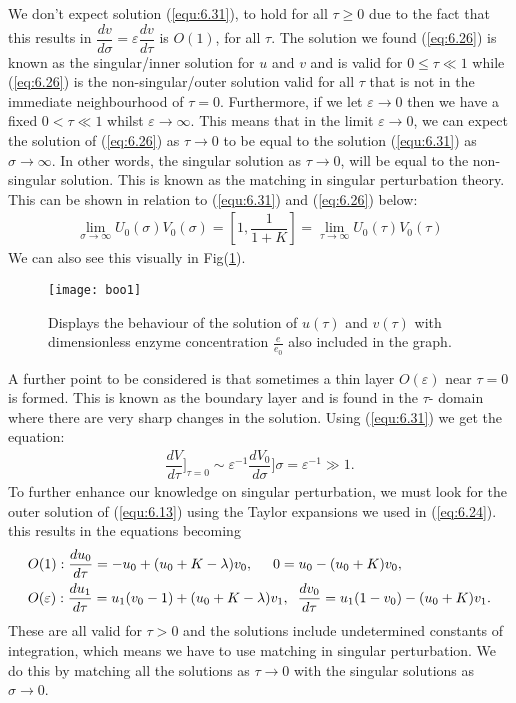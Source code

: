 \documentclass[a4paper]{report}
\theoremstyle{definition}
\begin{document}
We don't expect solution (\ref{equ:6.31}), to hold for all $\tau\geq0$ due to the fact that this results in $\dfrac{dv}{d\sigma}=\varepsilon\dfrac{dv}{d\tau}$ is $O(1)$, for all $\tau$. The solution we found (\ref{eq:6.26}) is known as the singular/inner solution for $u$ and $v$ and is valid for $0\leq\tau\ll1$ while (\ref{eq:6.26}) is the non-singular/outer solution valid for all $\tau$ that is not in the immediate neighbourhood of $\tau=0$. Furthermore, if we let $\varepsilon\rightarrow0$ then we have a fixed $0<\tau\ll1$ whilst $\varepsilon\rightarrow\infty$. This means that in the limit $\varepsilon\rightarrow0$, we can expect the solution of (\ref{eq:6.26}) as $\tau\rightarrow0$ to be equal to the solution (\ref{equ:6.31}) as $\sigma\rightarrow\infty$. In other words, the singular solution as $\tau\rightarrow0$, will be equal to the non-singular solution. This is known as the matching in singular perturbation theory. This can be shown in relation to (\ref{equ:6.31}) and (\ref{eq:6.26}) below:
\begin{align}
\lim_{\sigma \to \infty}U_0(\sigma)V_0(\sigma)=\left[1,\dfrac{1}{1+K}\right]=\lim_{\tau \to \infty}U_0(\tau)V_0(\tau)
\end{align}
We can also see this visually in Fig(\ref{figure1a}).
\begin{figure}
 \texttt{[image: boo1]}
   \caption{Displays the behaviour of the solution of $u(\tau)$ and $v(\tau)$ with dimensionless enzyme concentration $\frac{e}{e_0}$ also included in the graph. }
  \label{figure1a}
\end{figure}
A further point to be considered is that sometimes a thin layer $O(\varepsilon)$ near $\tau=0$ is formed. This is known as the boundary layer and is found in the $\tau$- domain where there are very sharp changes in the solution. Using (\ref{equ:6.31}) we get the equation:
\begin{align}
\dfrac{dV}{d\tau}]_{\tau=0}\sim\varepsilon^{-1}\dfrac{dV_0}{d\sigma}]\sigma=\varepsilon^{-1}\gg1.
\end{align}
To further enhance our knowledge on singular perturbation, we must look for the outer solution of (\ref{equ:6.13}) using the Taylor expansions we used in (\ref{eq:6.24}). this results in the equations becoming
\begin{align}\label{equ:6.32}
&O(1): \dfrac{du_0}{d\tau}=-u_0+(u_0+K-\lambda)v_0,\hspace{5mm} 0=u_0-(u_0+K)v_0,\\
&O(\varepsilon): \dfrac{du_1}{d\tau}=u_1(v_0-1)+(u_0+K-\lambda)v_1,\hspace{2mm}\dfrac{dv_0}{d\tau}=u_1(1-v_0)-(u_0+K)v_1.
\end{align}
These are all valid for $\tau>0$ and the solutions include undetermined constants of integration, which means we have to use matching in singular perturbation. We do this by matching all the solutions as $\tau\rightarrow0$ with the singular solutions as $\sigma\rightarrow0$. 
\end{document}
